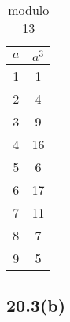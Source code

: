 \begin{table}[H]
\begin{subtable}[b]{.24\linewidth}
	\centering
	\begin{tabular}{c|c}
		$a$ & $a^3$ \\ \hline
		1   & 1  \\
		2   & 4  \\
		3   & 9  \\
		4   & 16 \\
		5   & 6  \\
		6   & 17 \\
		7   & 11 \\
		8   & 7  \\
		9   & 5
	\end{tabular}
	\caption*{modulo 13}
\end{subtable}
\end{table}


\subsection{20.3(b)}